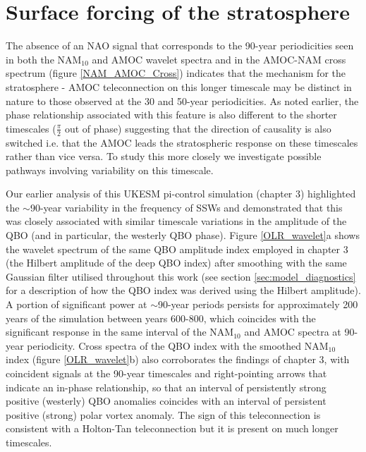 \section{Surface forcing of the stratosphere}\label{surface-strat_forcing}
The absence of an NAO signal that corresponds to the 90-year periodicities seen in both the NAM$_{10}$ and AMOC wavelet spectra and in the  AMOC-NAM cross spectrum (figure \ref{NAM_AMOC_Cross}) indicates that the mechanism for the stratosphere - AMOC teleconnection on this longer timescale may be distinct in nature to those observed at the 30 and 50-year periodicities. As noted earlier, the phase relationship associated with this feature is also different to the shorter timescales ($\frac{\pi}{2}$ out of phase) suggesting that the direction of causality is also switched i.e. that the AMOC leads the stratospheric response on these timescales rather than vice versa. To study this more closely we investigate possible pathways involving variability on this timescale.

Our earlier analysis of this UKESM pi-control simulation (chapter 3) highlighted the $\sim$90-year variability in the frequency of SSWs and demonstrated that this was closely associated with similar timescale variations in the amplitude of the QBO (and in particular, the westerly QBO phase). Figure \ref{OLR_wavelet}a shows the wavelet spectrum of the same QBO amplitude index employed in chapter 3 (the Hilbert amplitude of the deep QBO index) after smoothing with the same Gaussian filter utilised throughout this work (see section \ref{sec:model_diagnostics} for a description of how the QBO index was derived using the Hilbert amplitude). A portion of significant power at $\sim$90-year periods persists for approximately 200 years of the simulation between years 600-800, which coincides with the significant response in the same interval of the NAM$_{10}$ and AMOC spectra at 90-year periodicity. Cross spectra of the QBO index with the smoothed NAM$_{10}$ index (figure \ref{OLR_wavelet}b) also corroborates the findings of chapter 3, with coincident signals at the 90-year timescales and right-pointing arrows that indicate an in-phase relationship, so that an interval of persistently strong positive (westerly) QBO anomalies coincides with an interval of persistent positive (strong) polar vortex anomaly. The sign of this teleconnection is consistent with a Holton-Tan teleconnection \citep{luDecadalscale2008c, luMechanisms2014c} but it is present on much longer timescales. 


